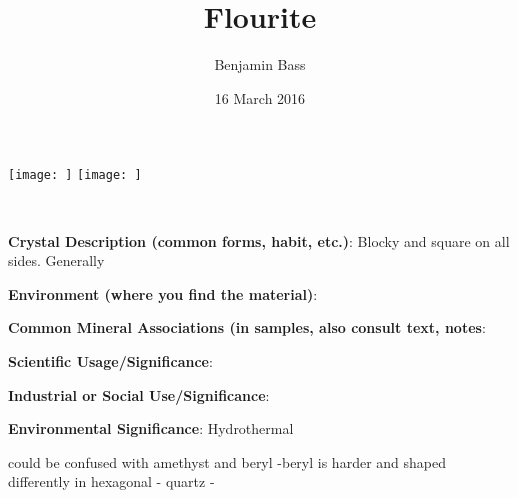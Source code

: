 \documentclass[10pt]{article}
\author{Benjamin Bass}
\date{16 March 2016}
\title{\vspace{-2.0cm} Flourite} %
\begin{document}
\maketitle


\begin{center}
  \texttt{[image: ]}
  \texttt{[image: ]}
\end{center}



\
\
\
\
\
\
\
\
\
\

\begin{framed}
  \textbf{Crystal Description (common forms, habit, etc.)}: Blocky and square on all sides. Generally
\end{framed}

\begin{framed}
  \textbf{Environment (where you find the material)}: 
\end{framed}

\begin{framed}
  \textbf{Common Mineral Associations (in samples, also consult text, notes}: 
\end{framed}

\begin{framed}
  \textbf{Scientific Usage/Significance}: 
\end{framed}

\begin{framed}
  \textbf{Industrial or Social Use/Significance}: 
\end{framed}

\begin{framed}
  \textbf{Environmental Significance}: Hydrothermal
\end{framed}


could be confused with amethyst and beryl
-beryl is harder and shaped differently in hexagonal
- quartz 
- 
\end{document}

